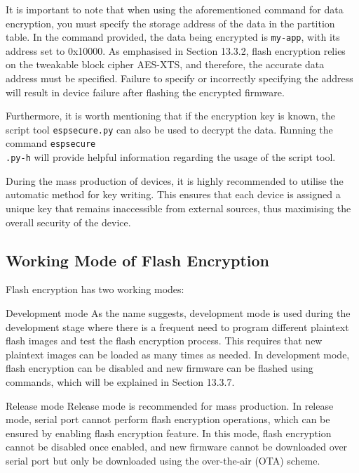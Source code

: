 \documentclass[a4paper,12pt]{book}
\begin{document}
It is important to note that when using the aforementioned command for data encryption, you must specify the storage address of the data in the partition table. In the command provided, the data being encrypted is \verb|my-app|, with its address set to 0x10000. As emphasised in Section 13.3.2, flash encryption relies on the tweakable block cipher AES-XTS, and therefore, the accurate data address must be specified. Failure to specify or incorrectly specifying the address will result in device failure after flashing the encrypted firmware.

Furthermore, it is worth mentioning that if the encryption key is known, the script tool \verb|espsecure.py| can also be used to decrypt the data. Running the command \verb|espsecure|\\ \verb|.py-h| will provide helpful information regarding the usage of the script tool.

During the mass production of devices, it is highly recommended to utilise the automatic method for key writing. This ensures that each device is assigned a unique key that remains inaccessible from external sources, thus maximising the overall security of the device.

\subsection{Working Mode of Flash Encryption}
Flash encryption has two working modes: 

\begin{term}{Development mode}
    As the name suggests, development mode is used during the development stage where there is a frequent need to program different plaintext flash images and test the flash encryption process. This requires that new plaintext images can be loaded as many times as needed. In development mode, flash encryption can be disabled and new firmware can be flashed using commands, which will be explained in Section 13.3.7.
\end{term}

\begin{term}{Release mode}
    Release mode is recommended for mass production. In release mode, serial port cannot perform flash encryption operations, which can be ensured by enabling flash encryption feature. In this mode, flash encryption cannot be disabled once enabled, and new firmware cannot be downloaded over serial port but only be downloaded using the over-the-air (OTA) scheme.
\end{term}
\end{document}
